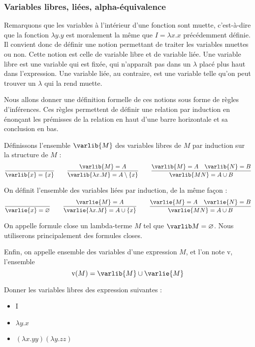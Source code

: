 \subsubsection{Variables libres, liées, alpha-équivalence}

Remarquons que les variables à l'intérieur d'une fonction sont muette, c'est-à-dire que la fonction $\lambda y.y$ est moralement la même que $I=\lambda x.x$ précédemment définie. Il convient donc de définir une notion permettant de traiter les variables muettes ou non. Cette notion est celle de variable libre et de variable liée. Une variable libre est une variable qui est fixée, qui n'apparaît pas dans un $\lambda$ placé \og plus haut\fg{} dans l'expression. Une variable liée, au contraire, est une variable telle qu'on peut trouver un $\lambda$ qui la rend muette.

Nous allons donner une définition formelle de ces notions sous forme de règles d'inférences. Ces règles permettent de définir une relation par induction en énonçant les prémisses de la relation en haut d'une barre horizontale et sa conclusion en bas.

\begin{defi}
    Définissons l'ensemble $\varlib{M}$ des variables libres de $M$ par induction sur la structure de $M$ :
    $$\dfrac{}{\varlib{x}=\{x\}}\qquad \dfrac{\varlib{M}=A}{\varlib{\lambda x. M}=A\setminus \{x\}}\qquad \dfrac{\varlib {M}=A \quad \varlib{N}=B}{\varlib{M N}=A\cup B}$$
    
    On définit l'ensemble des variables liées par induction, de la même façon :
    $$\dfrac{}{\varlie{x}=\varnothing}\qquad \dfrac{\varlie{M}=A}{\varlie{\lambda x. M}=A\cup \{x\}}\qquad \dfrac{\varlie {M}=A \quad \varlie{N}=B}{\varlie{M N}=A\cup B}$$
    
    On appelle formule close un lambda-terme $M$ tel que $\varlib M=\varnothing$. Nous utiliserons principalement des formules closes.
    
    Enfin, on appelle ensemble des variables d'une expression $M$, et l'on note $\mathrm v$, l'ensemble $$\mathrm v (M)= \varlib{M}\cup\varlie{M}$$
\end{defi}

\begin{exo}
    Donner les variables libres des expression suivantes :
    \begin{itemize}[label=$\bullet$]
        \item I
        \item $\lambda y.x$
        \item $(\lambda x. y y)(\lambda y.z z)$
    \end{itemize}
\end{exo}


